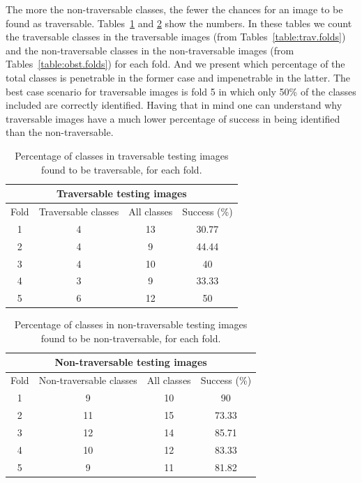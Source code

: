 \documentclass[12pt,a4paper,table,dvipsnames,tikz]{report}
\newcommand{\bl}[1]{{\hypersetup{linkcolor=blue}#1}}
\begin{document}
	The more the non-traversable classes, the fewer the chances for an image to be found as 
	traversable. Tables~\bl{\ref{table:trav.classes}} and \bl{\ref{table:obst.classes}} show 
	the numbers. In these tables we count the traversable classes in the traversable images 
	(from Tables~\bl{\ref{table:trav.folds}}) and the non-traversable classes in the 
	non-traversable images (from Tables~\bl{\ref{table:obst.folds}}) for each fold. And we 
	present which percentage of the total classes is penetrable in the former case and 
	impenetrable in the latter. The best case scenario for traversable images is fold 5 in 
	which only 50\% of the classes included are correctly identified. Having that in mind 
	one can understand why traversable images have a much lower percentage of success in 
	being identified than the non-traversable.
	\\
	
	
	\begin{table}[h!]
		\centering
		\begin{tabular}{|c|c|c|c|}
			\hline
			\multicolumn{4}{|c|}{Traversable testing images}\\
			\hline
			Fold & Traversable classes & All classes & Success (\%)\\
			\hline
			1 & 4 & 13 & 30.77\\
			\hline
			2 & 4 & 9 & 44.44\\
			\hline
			3 & 4 & 10 & 40\\
			\hline
			4 & 3 & 9 & 33.33\\
			\hline
			5 & 6 & 12 & 50\\
			\hline
		\end{tabular}
		\caption{Percentage of classes in traversable testing images found to be traversable, 
			for each fold.}
		\label{table:trav.classes}
	\end{table}
	
	\begin{table}[h!]
		\centering
		\begin{tabular}{|c|c|c|c|}
			\hline
			\multicolumn{4}{|c|}{Non-traversable testing images}\\
			\hline
			Fold & Non-traversable classes & All classes & Success (\%)\\
			\hline
			1 & 9 & 10 & 90\\
			\hline
			2 & 11 & 15 & 73.33\\
			\hline
			3 & 12 & 14 & 85.71\\
			\hline
			4 & 10 & 12 & 83.33\\
			\hline
			5 & 9 & 11 & 81.82\\
			\hline
		\end{tabular}
		\caption{Percentage of classes in non-traversable testing images found to be 
			non-traversable, for each fold.}
		\label{table:obst.classes}
	\end{table}
	
\end{document}
